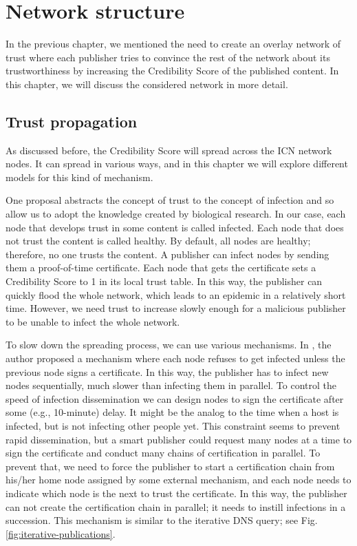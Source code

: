 \chapter{Network structure}
\label{network-structure}
In the previous chapter, we mentioned the need to create an overlay network of trust where each publisher tries to convince the rest of the network about its trustworthiness by increasing the Credibility Score of the published content. In this chapter, we will discuss the considered network in more detail. 

\section{Trust propagation}

As discussed before, the Credibility Score will spread across the ICN network nodes. It can spread in various ways, and in this chapter we will explore different models for this kind of mechanism. 

One proposal\cite{konorski2019mitigating} abstracts the concept of trust to the concept of infection and so allow us to adopt the knowledge created by biological research. In our case, each node that develops trust in some content is called infected. Each node that does not trust the content is called healthy. By default, all nodes are healthy; therefore, no one trusts the content.
A publisher can infect nodes by sending them a proof-of-time certificate.
Each node that gets the certificate sets a Credibility Score to 1 in its local trust table. In this way, the publisher can quickly flood the whole network, which leads to an epidemic in a relatively short time. However, we need trust to increase slowly enough for a malicious publisher to be unable to infect the whole network. 

To slow down the spreading process, we can use various mechanisms. In \cite{konorski2019mitigating}, the author proposed a mechanism where each node refuses to get infected unless the previous node signs a certificate. In this way, the publisher has to infect new nodes sequentially, much slower than infecting them in parallel. To control the speed of infection dissemination we can design nodes to sign the certificate after some (e.g., 10-minute) delay. It might be the analog to the time when a host is infected, but is not infecting other people yet. This constraint seems to prevent rapid dissemination, but a smart publisher could request many nodes at a time to sign the certificate and conduct many chains of certification in parallel. To prevent that, we need to force the publisher to start a certification chain from his/her home node assigned by some external mechanism, and each node needs to indicate which node is the next to trust the certificate. In this way, the publisher can not create the certification chain in parallel; it needs to instill infections in a succession. This mechanism is similar to the iterative DNS query; see Fig. \ref{fig:iterative-publications}.


